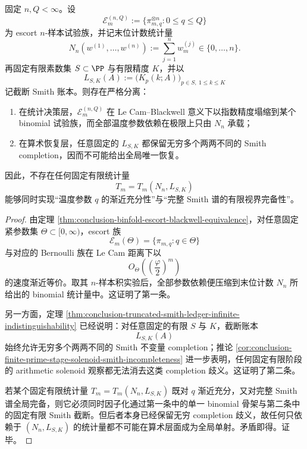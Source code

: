 \begin{theorem}[热统计上的一位充分性与算术审计上的无限歧义严格正交]\label{thm:conclusion-window6-statistical-arithmetic-strict-orthogonality}
固定 \(n,Q<\infty\)。设
\[
\mathcal E_m^{(n,Q)}
:=
\{\pi_{m,q}^{\otimes n}:0\le q\le Q\}
\]
为 escort \(n\)-样本试验族，并记末位计数统计量
\[
N_n(w^{(1)},\dots,w^{(n)})
:=
\sum_{j=1}^n w_m^{(j)}\in\{0,\dots,n\}.
\]
再固定有限素数集 \(S\subset\PP\) 与有限精度 \(K\)，并以
\[
L_{S,K}(A):=\bigl(K_p(k;A)\bigr)_{p\in S,\ 1\le k\le K}
\]
记截断 Smith 账本。则存在严格分离：
\begin{enumerate}
  \item 在统计决策层，\(\mathcal E_m^{(n,Q)}\) 在 Le Cam--Blackwell 意义下以指数精度塌缩到某个 binomial 试验族，而全部温度参数依赖在极限上只由 \(N_n\) 承载；
  \item 在算术恢复层，任意固定的 \(L_{S,K}\) 都保留无穷多个两两不同的 Smith completion，因而不可能给出全局唯一恢复。
\end{enumerate}
因此，不存在任何固定有限统计量
\[
T_m=T_m(N_n,L_{S,K})
\]
能够同时实现“温度参数 \(q\) 的渐近充分性”与“完整 Smith 谱的有限视界完备性”。
\end{theorem}
\begin{proof}
由定理 \ref{thm:conclusion-binfold-escort-blackwell-equivalence}，对任意固定紧参数集 \(\Theta\subset[0,\infty)\)，escort 族
\[
\mathcal E_m(\Theta)=\{\pi_{m,q}:q\in\Theta\}
\]
与对应的 Bernoulli 族在 Le Cam 距离下以
\[
O_\Theta\!\left(\left(\frac{\varphi}{2}\right)^m\right)
\]
的速度渐近等价。取其 \(n\)-样本积实验后，全部参数依赖便压缩到末位计数 \(N_n\) 所给出的 binomial 统计量中。这证明了第一条。

另一方面，定理 \ref{thm:conclusion-truncated-smith-ledger-infinite-indistinguishability} 已经说明：对任意固定的有限 \(S\) 与 \(K\)，截断账本
\[
L_{S,K}(A)
\]
始终允许无穷多个两两不同的 Smith 不变量 completion；推论 \ref{cor:conclusion-finite-prime-stage-solenoid-smith-incompleteness} 进一步表明，任何固定有限阶段的 arithmetic solenoid 观察都无法消去这类 completion 歧义。这证明了第二条。

若某个固定有限统计量 \(T_m=T_m(N_n,L_{S,K})\) 既对 \(q\) 渐近充分，又对完整 Smith 谱全局完备，则它必须同时因子化通过第一条中的单一 binomial 骨架与第二条中的固定有限 Smith 截断。但后者本身已经保留无穷 completion 歧义，故任何只依赖于 \((N_n,L_{S,K})\) 的统计量都不可能在算术层面成为全局单射。矛盾即得。证毕。
\end{proof}


